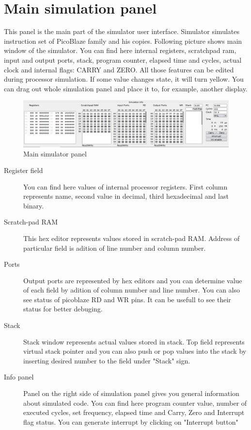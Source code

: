 
\section{Main simulation panel}
    This panel is the main part of the simulator user interface. Simulator simulates instruction set of PicoBlaze family and his copies.
    Following picture shows main window of the simulator. You can find here internal registers, scratchpad ram, input and output ports, stack,
    program counter, elapsed time and cycles, actual clock and internal flags: CARRY and ZERO. All those features can be edited during
    processor simulation. If some value changes state, it will turn yellow. You can drag out whole simulation panel and place it to, for example, another display.

   \begin{figure}[h!]
        \centering
        \includegraphics[width=\textwidth]{img/bottom_panel.png}
        \caption{Main simulator panel}
    \end{figure}

    \begin{description}
     \item [Register field] You can find here values of internal processor registers. First column represents name, second value in decimal, third
     hexadecimal and last binary.
     \item [Scratch-pad RAM] This hex editor represents values stored in scratch-pad RAM. Address of particular field is adition of line number
     and column number.
     \item [Ports] Output ports are represented by hex editors and you can determine value of each field by adition of column number and line number.
     You can also see status of picoblaze RD and WR pins. It can be usefull to see their status for better debuging.
     \item [Stack] Stack window represents actual values stored in stack. Top field represents virtual stack pointer and you can also push or pop values into the stack
     by inserting desired number to the field under "Stack" sign.
     \item [Info panel] Panel on the right side of simulation panel gives you general information about simulated code. You can find here program counter
     value, number of executed cycles, set  frequency, elapsed time and Carry, Zero and Interrupt flag status. You can generate interrupt by clicking on "Interrupt button"
    \end{description}

